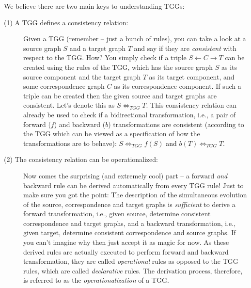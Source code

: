 We believe there are two main keys to understanding TGGs:
\begin{description}
\item[(1) A TGG defines a consistency relation:]
	Given a TGG (remember -- just a bunch of rules), you can take a look at a source graph $S$ and a target graph $T$ and say if they are \emph{consistent} with respect to the TGG.
	How?  You simply check if a triple $S\leftarrow C\rightarrow T$ can be created using the rules of the TGG, which has the source graph $S$ as its source component and the target graph $T$ as its target component, and some correspondence graph $C$ as its correspondence component.
	If such a triple can be created then the given source and target graphs are consistent.
	Let's denote this as $S \Leftrightarrow_{TGG} T$.
	This consistency relation can already be used to check if a bidirectional transformation, i.e., a pair of forward ($f$) and backward ($b$) transformations are consistent (according to the TGG which can be viewed as a specification of how the transformations are to behave):  $S \Leftrightarrow_{TGG} f(S)$ and $b(T) \Leftrightarrow_{TGG} T$.
	
\item[(2) The consistency relation can be operationalized:]
Now comes the surprising (and extremely cool) part -- a forward \emph{and} backward rule can be derived automatically from every TGG rule!
Just to make sure you got the point:  The description of the simultaneous evolution of the source, correspondence and target graphs is \emph{sufficient} to derive a forward transformation, i.e., given source, determine consistent correspondence and target graphs, and a backward transformation, i.e., given target, determine consistent correspondence and source graphs.
If you can't imagine why then just accept it as magic for now.
As these derived rules are actually executed to perform forward and backward transformation, they are called \emph{operational} rules as opposed to the TGG rules, which are called \emph{declarative} rules.
The derivation process, therefore, is referred to as the \emph{operationalization} of a TGG. 
\end{description}

